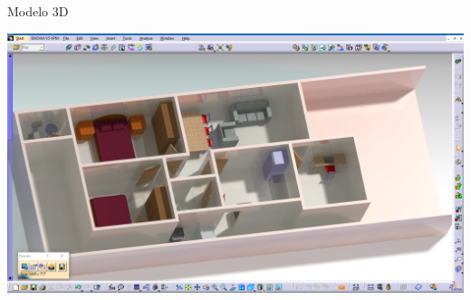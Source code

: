 \begin{center}
\caption{Modelo 3D}
\includegraphics[width=\textwidth]{figuras/modelo3D}
\end{center}
